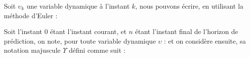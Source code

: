 			Soit $\upsilon_k$ une variable dynamique à l'instant $k$, nous pouvons écrire, en utilisant la méthode d'Euler :
			
			Soit l'instant $0$ étant l'instant courant, et $n$ étant l'instant final de l'horizon de prédiction, on note, pour toute variable dynamique $\upsilon$ :
			et on considère ensuite, sa notation majuscule $\Upsilon$ défini comme suit :
			
